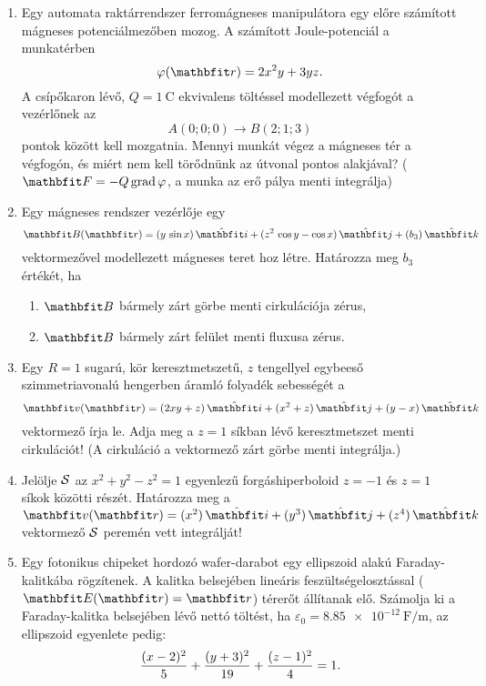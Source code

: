 \documentclass{szb-practice}
\begin{document}
\begin{enumerate}
  \item Egy automata raktárrendszer ferromágneses manipulátora egy előre
        számított mágneses potenciálmezőben mozog. A számított Joule-potenciál a
        munkatérben
        $$
          \varphi(\coordv) = 2x^2 y + 3yz
          \text.
        $$
        A csípőkaron lévő, $Q = \SI{1}{\coulomb}$ ekvivalens töltéssel
        modellezett végfogót a vezérlőnek az
        $$
          A(0;0;0) \rightarrow B(2;1;3)
        $$
        pontok között kell mozgatnia. Mennyi munkát végez a mágneses tér a
        végfogón, és miért nem kell törődnünk az útvonal pontos alakjával?
        ($\rvec F = -Q \grad \varphi$, a munka az erő pálya menti integrálja)

  \item Egy mágneses rendszer vezérlője egy
        $$
          \rvec B(\coordv) = \ijk{y \, \sin x}{z^2 \, \cos y - \cos x}{b_3}
        $$
        vektormezővel modellezett mágneses teret hoz létre. Határozza meg
        $b_3$ értékét, ha
        \begin{enumerate}
          \item $\rvec B$ bármely zárt görbe menti cirkulációja zérus,
          \item $\rvec B$ bármely zárt felület menti fluxusa zérus.
        \end{enumerate}

  \item Egy $R = 1$ sugarú, kör keresztmetszetű, $z$ tengellyel egybeeső
        szimmetriavonalú hengerben áramló folyadék sebességét a
        $$
          \rvec v(\coordv) = \ijk{2xy + z}{x^2 + z}{y - x}
        $$
        vektormező írja le. Adja meg a $z = 1$ síkban lévő keresztmetszet
        menti cirkulációt!
        (A cirkuláció a vektormező zárt görbe menti integrálja.)

  \item Jelölje $\mathcal{S}$ az $x^2 + y^2 - z^2 = 1$ egyenlezű
        forgáshiperboloid $z = -1$ és $z = 1$ síkok közötti részét.
        Határozza meg a $\rvec v(\coordvec) = \ijk{x^2}{y^3}{z^4}$
        vektormező $\mathcal{S}$ peremén vett integrálját!

  \item Egy fotonikus chipeket hordozó wafer-darabot egy ellipszoid alakú
        Faraday-kalitkába rögzítenek. A kalitka belsejében lineáris
        feszültségelosztással ($\rvec E(\coordv) = \coordv$) térerőt állítanak
        elő. Számolja ki a Faraday-kalitka belsejében lévő nettó töltést, ha
        $\varepsilon_0 = \SI[per-mode=symbol]{8,85e-12}{\farad\per\meter}$,
        az ellipszoid egyenlete pedig:
        $$
          \frac{(x - 2)^2}{5} + \frac{(y + 3)^2}{19} + \frac{(z - 1)^2}{4} = 1
          \text.
        $$


\end{enumerate}
\end{document}
